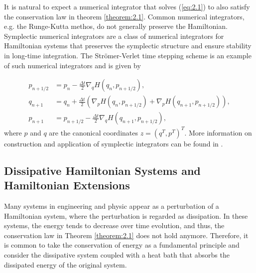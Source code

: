 It is natural to expect a numerical integrator that solves (\ref{eq:2.1}) to also satisfy the conservation law in theorem \ref{theorem:2.1}. Common numerical integrators, e.g. the Runge-Kutta methos, do not generally preserve the Hamiltonian. Symplectic numerical integrators are a class of numerical integrators for Hamiltonian systems that preserves the symplectic structure and ensure stability in long-time integration. The Str\"omer-Verlet time stepping scheme is an example of such numerical integrators and is given by

\begin{equation} \label{eq:2.3}
\begin{aligned}
	p_{n+1/2} &= p_n - \frac{\Delta t}{2} \nabla_qH(q_{n},p_{n+1/2}), \\
	q_{n+1} &= q_n + \frac{\Delta t}{2} \left( \nabla_pH(q_{n},p_{n+1/2}) + \nabla_pH(q_{n+1},p_{n+1/2}) \right),\\
	p_{n+1} &= p_{n+1/2} - \frac{\Delta t}{2} \nabla_qH(q_{n+1},p_{n+1/2}),
\end{aligned}
\end{equation}
where $p$ and $q$ are the canonical coordinates $z = (q^T,p^T)^T$. More information on construction and application of symplectic integrators can be found in \cite{Hairer:1250576}.

\subsection{Dissipative Hamiltonian Systems and Hamiltonian Extensions} \label{sec:2.2}

Many systems in engineering and physic appear as a perturbation of a Hamiltonian system, where the perturbation is regarded as dissipation. In these systems, the energy tends to decrease over time evolution, and thus, the conservation law in Theorem \ref{theorem:2.1} does not hold anymore. Therefore, it is common to take the conservation of energy as a fundamental principle and consider the dissipative system coupled with a heat bath that absorbs the dissipated energy of the original system. 

